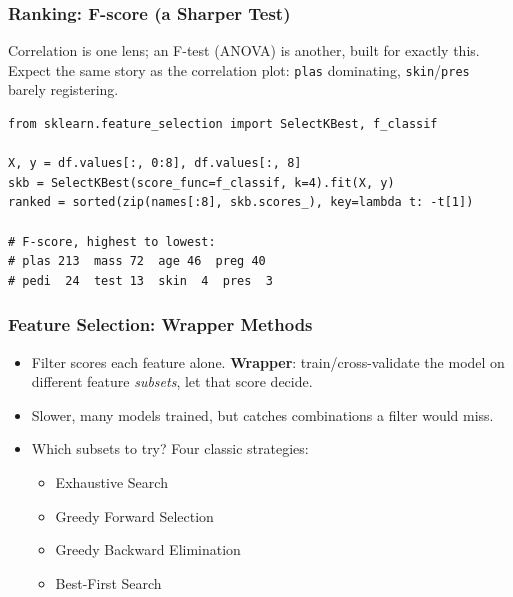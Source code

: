 \begin{frame}[fragile]\frametitle{Ranking: F-score (a Sharper Test)}
Correlation is one lens; an F-test (ANOVA) is another, built for exactly this. Expect the same story as the correlation plot: \texttt{plas} dominating, \texttt{skin}/\texttt{pres} barely registering.
\begin{lstlisting}
from sklearn.feature_selection import SelectKBest, f_classif

X, y = df.values[:, 0:8], df.values[:, 8]
skb = SelectKBest(score_func=f_classif, k=4).fit(X, y)
ranked = sorted(zip(names[:8], skb.scores_), key=lambda t: -t[1])

# F-score, highest to lowest:
# plas 213  mass 72  age 46  preg 40
# pedi  24  test 13  skin  4  pres  3
\end{lstlisting}
\end{frame}

\begin{frame}[fragile]\frametitle{Feature Selection: Wrapper Methods}
\begin{itemize}
\item Filter scores each feature alone. \textbf{Wrapper}: train/cross-validate the model on different feature \emph{subsets}, let that score decide.
\item Slower, many models trained, but catches combinations a filter would miss.
\item Which subsets to try? Four classic strategies:
	\begin{itemize}
	\item Exhaustive Search
	\item Greedy Forward Selection
	\item Greedy Backward Elimination
	\item Best-First Search
	\end{itemize}
\end{itemize}
\end{frame}

